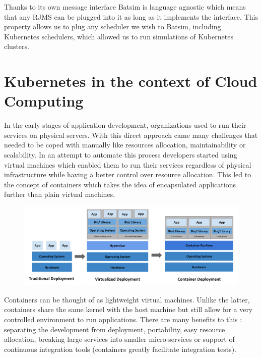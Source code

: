 Thanks to its own message interface Batsim is language agnostic which means
that any RJMS can be plugged into it as long as it implements the interface.
This property allows us to plug any scheduler we wish to Batsim, including
Kubernetes schedulers, which allowed us to run simulations of Kubernetes
clusters.

\section{Kubernetes in the context of Cloud Computing}

In the early stages of application development, organizations used to run their
services on physical servers. With this direct approach came many challenges
that needed to be coped with manually like resources allocation,
maintainability or scalability. In an attempt to automate this process
developers started using virtual machines which enabled them to run their
services regardless of physical infrastructure while having a better control
over resource allocation.  This led to the concept of containers which takes
the idea of encapsulated applications further than plain virtual machines.

\begin{figure}[h]
	\centering
	\includegraphics[width=\textwidth]{./imgs/container_evolution.png}
	\label{fig:container-evolution}
\end{figure}

Containers can be thought of as lightweight virtual machines. Unlike the
latter, containers share the same kernel with the host machine but still allow
for a very controlled environment to run applications. There are many
benefits to this : separating the development from deployment, portability,
easy resource allocation, breaking large services into smaller micro-services
or support of continuous integration tools (containers greatly facilitate
integration tests).\\

